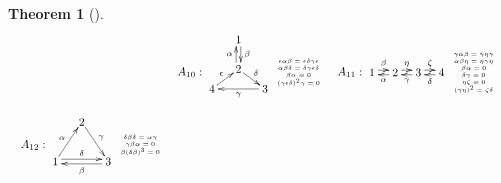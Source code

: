 \documentclass[12pt]{amsart}
\newtheorem{thm}{Theorem}[section]
\numberwithin{equation}{thm}
\begin{document}
{\begin{thm}[{\cite[Theorem, Theorem]{S}}]
\[\begin{array}{c}
\begin{array}{lll}
{\begin{array}{c}
\end{array}
}
&
A_{10}:
\begin{xy}
(8,10) *[o]+{1}="A", (8,1) *[o]+{2}="B", (16,-5) *[o]+{3}="C", (0,-5) *[o]+{4}="D",
\ar @<2pt>"A";"B"^{\beta}
\ar @<2pt>"B";"A"^{\alpha}
\ar "B";"C"^{\delta}
\ar "C";"D"^{\gamma}
\ar "D";"B"^{\epsilon}
\end{xy}
{\tiny \begin{array}{c}
  \epsilon\alpha\beta=\epsilon\delta\gamma\epsilon \\
  \alpha\beta\delta=\delta\gamma\epsilon\delta\\
 \beta\alpha=0 \\
 (\gamma\epsilon\delta)^2\gamma=0 \\
\end{array}
}

&
A_{11}:
\begin{xy}
(0,0) *[o]+{1}="A", (7,0) *[o]+{2}="B", (14,0) *[o]+{3}="C", (21,0) *[o]+{4}="D",
\ar @<2pt> "A";"B"^{\beta}
\ar @<2pt> "B";"A"^{\alpha}
\ar @<2pt> "B";"C"^{\eta }
\ar @<2pt> "C";"B"^{\gamma}
\ar @<2pt> "C";"D"^{\zeta}
\ar @<2pt> "D";"C"^{\delta}
\end{xy}
{\tiny \begin{array}{c}
  \gamma\alpha\beta=\gamma\eta\gamma \\
 \alpha\beta\eta=\eta\gamma\eta \\
 \beta\alpha=0 \\
 \delta\gamma=0 \\
 \eta\zeta=0\\
 (\gamma\eta)^2=\zeta\delta
\end{array}
}\\\\

A_{12}:
\begin{xy}
(0,-5)*[o]+{1}="A",(8,7)*[o]+{2}="B", (16,-5)*[o]+{3}="C", 
\ar "A";"B"^{\alpha}
\ar "B";"C"^{\gamma}
\ar @<2pt>"C";"A"^{\beta}
\ar @<2pt>"A";"C"^{\delta}
\end{xy}
{\tiny \begin{array}{c}
\delta\beta\delta=\alpha\gamma \\
\gamma\beta\alpha=0 \\
\beta(\delta\beta)^3=0\\
\end{array}
}

&


\end{array}
\end{array}\]
\end{thm}}
\end{document}
